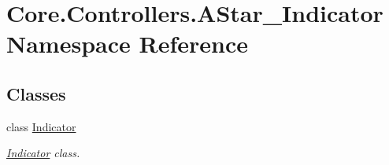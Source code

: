 \hypertarget{namespaceCore_1_1Controllers_1_1AStar__Indicator}{}\section{Core.\+Controllers.\+A\+Star\+\_\+\+Indicator Namespace Reference}
\label{namespaceCore_1_1Controllers_1_1AStar__Indicator}
\subsection*{Classes}
\begin{DoxyCompactItemize}
\item 
class \hyperlink{classCore_1_1Controllers_1_1AStar__Indicator_1_1Indicator}{Indicator}
\begin{DoxyCompactList}\small\item\em \hyperlink{classCore_1_1Controllers_1_1AStar__Indicator_1_1Indicator}{Indicator} class. \end{DoxyCompactList}\end{DoxyCompactItemize}
